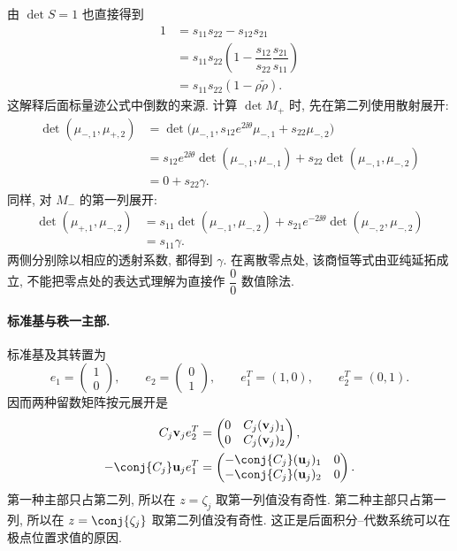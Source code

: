 由 $\det S=1$ 也直接得到
\[
\begin{aligned}
1
&=s_{11}s_{22}-s_{12}s_{21}\\
&=s_{11}s_{22}
\left(1-\dfrac{s_{12}}{s_{22}}\dfrac{s_{21}}{s_{11}}\right)\\
&=s_{11}s_{22}(1-\rho\widetilde\rho).
\end{aligned}
\]
这解释后面标量迹公式中倒数的来源.
计算 $\det M_+$ 时, 先在第二列使用散射展开:
\[
\begin{aligned}
\det(\mu_{-,1},\mu_{+,2})
&=\det\bigl(\mu_{-,1},
s_{12}e^{2\ii\theta}\mu_{-,1}+s_{22}\mu_{-,2}\bigr)\\
&=s_{12}e^{2\ii\theta}
\det(\mu_{-,1},\mu_{-,1})
+s_{22}\det(\mu_{-,1},\mu_{-,2})\\
&=0+s_{22}\gamma.
\end{aligned}
\]
同样, 对 $M_-$ 的第一列展开:
\[
\begin{aligned}
\det(\mu_{+,1},\mu_{-,2})
&=s_{11}\det(\mu_{-,1},\mu_{-,2})
+s_{21}e^{-2\ii\theta}\det(\mu_{-,2},\mu_{-,2})\\
&=s_{11}\gamma.
\end{aligned}
\]
两侧分别除以相应的透射系数, 都得到 $\gamma$.
在离散零点处, 该商恒等式由亚纯延拓成立, 不能把零点处的表达式理解为直接作 $\dfrac{0}{0}$ 数值除法.

\paragraph{标准基与秩一主部.}
标准基及其转置为
\[
e_1=\begin{pmatrix}1\\0\end{pmatrix},\qquad
e_2=\begin{pmatrix}0\\1\end{pmatrix},\qquad
e_1^T=(1,0),\qquad e_2^T=(0,1).
\]
因而两种留数矩阵按元展开是
\[
\begin{aligned}
C_j\mathbf v_je_2^T
&=\begin{pmatrix}
0&C_j(\mathbf v_j)_1\\
0&C_j(\mathbf v_j)_2
\end{pmatrix},\\
-\conj{C_j}\mathbf u_je_1^T
&=\begin{pmatrix}
-\conj{C_j}(\mathbf u_j)_1&0\\
-\conj{C_j}(\mathbf u_j)_2&0
\end{pmatrix}.
\end{aligned}
\]
第一种主部只占第二列, 所以在 $z=\zeta_j$ 取第一列值没有奇性.
第二种主部只占第一列, 所以在 $z=\conj{\zeta_j}$ 取第二列值没有奇性.
这正是后面积分--代数系统可以在极点位置求值的原因.
